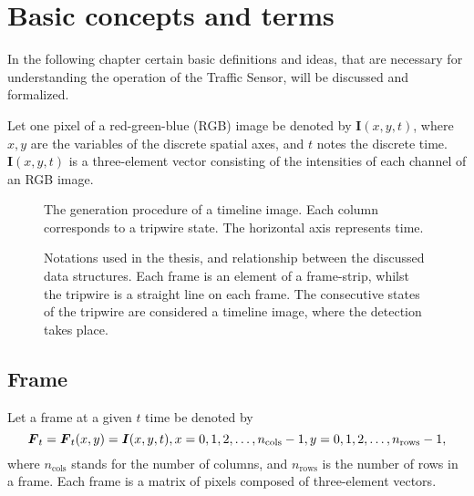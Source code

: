 \chapter{Basic concepts and terms}\label{chap:Concepts}
In the following chapter certain basic definitions and ideas, that are necessary for understanding the operation of the Traffic Sensor, will be discussed and formalized.

Let one pixel of a red-green-blue (RGB) image be denoted by $\boldsymbol{I}(x,y,t)$, where $x, y$ are the variables of the discrete spatial axes, and $t$ notes the discrete time.
$\boldsymbol{I}(x,y,t)$ is a three-element vector consisting of the intensities of each channel of an RGB image.
\begin{figure}[bh]
	\centering
	
	\caption{The generation procedure of a timeline image. Each column corresponds to a tripwire state. The horizontal axis represents time.\label{fig:TI_creation}}
\end{figure}
\begin{figure}[h!]
	\centering
	\scalebox{.7}{}
	\caption{Notations used in the thesis, and relationship between the discussed data structures. Each frame is an element of a frame-strip, whilst the tripwire is a straight line on each frame. The consecutive states of the tripwire are considered a timeline image, where the detection takes place.	\label{fig:notations}}
\end{figure}
\section{Frame}
Let a frame at a given $t$ time be denoted by
\begin{displaymath}
	\boldsymbol{F}_t=\boldsymbol{F}_t(x,y)=\boldsymbol{I}(x,y,t),\\
	x=0,1,2,\dotsc,n_{\text{cols}}-1,\\
	y=0,1,2,\dotsc,n_{\text{rows}}-1,
\end{displaymath}
where $n_{\text{cols}}$ stands for the number of columns, and $n_{\text{rows}}$ is the number of rows in a frame.
Each frame is a matrix of pixels composed of three-element vectors. 

